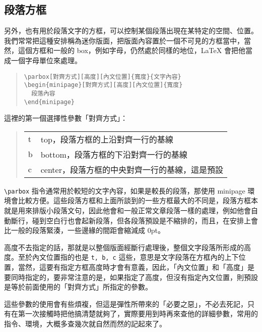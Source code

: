 \subsection{段落方框}

另外，也有用於段落文字的方框，可以控制某個段落出現在某特定的空間、位置。我們常常把這種安排稱為迷你版面，把版面內容置於一個不可見的方框當中，當然，這個方框和一般的 box，例如字母，仍然處於同樣的地位，\LaTeX{} 會把他當成一個字母單位來處理。

\begin{quote}
   \begin{verbatim}
\parbox[對齊方式][高度][內文位置]{寬度}{文字內容}
\begin{minipage}[對齊方式][高度][內文位置]{寬度}
  段落內容
\end{minipage}
\end{verbatim}
\end{quote}

這裡的第一個選擇性參數「對齊方式」：

\begin{quote}
   \begin{tabular}{>{\ttfamily }ll}
      t & top，段落方框的上沿對齊一行的基線              \\
      b & bottom，段落方框的下沿對齊一行的基線           \\
      c & center，段落方框的中央對齊一行的基線，這是預設 \\
   \end{tabular}
\end{quote}

\verb|\parbox| 指令通常用於較短的文字內容，如果是較長的段落，那使用 {\ttfamily minipage} 環境會比較方便。這些段落方框和上面所談到的一些方框最大的不同是，段落方框本就是用來排版小段落文句，因此他會和一般正常文章段落一樣的處理，例如他會自動斷行，碰到空白行也會起新段落，但各段落預設是不縮排的，而且，在安排上會比一般的段落緊湊，一些邊緣的間距會縮減成 0pt。

高度不去指定的話，那就是以整個版面經斷行處理後，整個文字段落所形成的高度。至於內文位置指的也是 \texttt{t, b, c} 這些，意思是文字段落在方框內的上下位置，當然，這要有指定方框高度時才會有意義，因此，「內文位置」和「高度」是要同時指定的，要非常注意的是，如果指定了高度，但沒有指定內文位置，則預設是等於前面使用的「對齊方式」所指定的參數。

這些參數的使用會有些煩複，但這是彈性所帶來的「必要之惡」，不必去死記，只有在第一次接觸時把他搞清楚就夠了，實際要用到時再來查他的詳細參數，常用的指令、環境，大概多查幾次就自然而然的記起來了。
